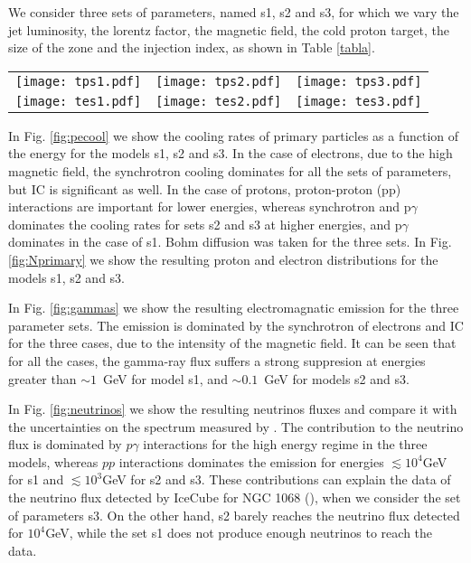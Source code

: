 \documentclass[baaa]{baaa}
\begin{document}
We consider three sets of parameters, named s1, s2 and s3, for which we vary the jet luminosity, the lorentz factor, the magnetic field, the cold proton target, the size of the zone and the injection index, as shown in Table \ref{tabla}. 

\begin{figure*}[!ht] 
\centering
\renewcommand{\arraystretch}{0}
\setlength{\tabcolsep}{0pt}

\begin{tabular}{ccc}
\texttt{[image: tps1.pdf]} &
\texttt{[image: tps2.pdf]} &
\texttt{[image: tps3.pdf]} \\
\texttt{[image: tes1.pdf]} &
\texttt{[image: tes2.pdf]}  &
\texttt{[image: tes3.pdf]} \\
\end{tabular}
%
\caption{\textit{Top panels:} Proton cooling rates for the models s1 (\textit{left panel}), s2 (\textit{middle panel}) and s3 (\textit{right panel}). \textit{Bottom panels}: same as above but for electrons.}
\label{fig:pecool}
\end{figure*}



In Fig. \ref{fig:pecool} we show the cooling rates of primary particles as a function of the energy for the models s1, s2 and s3. In the case of electrons, due to the high magnetic field, the synchrotron cooling dominates for all the sets of parameters, but IC is significant as well. In the case of protons, proton-proton (pp) interactions are important for lower energies, whereas synchrotron and p$\gamma$ dominates the cooling rates for sets s2 and s3 at higher energies, and p$\gamma$ dominates in the case of s1. Bohm diffusion was taken for the three sets. In Fig. \ref{fig:Nprimary} we show the resulting proton and electron distributions for the models s1, s2 and s3.

In Fig. \ref{fig:gammas} we show the resulting electromagnatic emission for the three parameter sets. The emission is dominated by the synchrotron of electrons and IC for the three cases, due to the intensity of the magnetic field. It can be seen that for all the cases, the gamma-ray flux suffers a strong suppresion at energies greater than $\sim 1$~GeV for model s1, and $\sim 0.1$~GeV for models s2 and s3.

In Fig. \ref{fig:neutrinos} we show the resulting neutrinos fluxes and compare it with the uncertainties on the spectrum measured by \cite{Aartsen2020}. The contribution to the neutrino flux is dominated by $p\gamma$ interactions for the high energy regime in the three models, whereas $pp$ interactions dominates the emission for energies $\lesssim10^4$GeV for s1 and $\lesssim10^3$GeV for s2 and s3. These contributions can explain the data of the neutrino flux detected by IceCube for NGC 1068 (\citealt{Aartsen2020}), when we consider the set of parameters s3. On the other hand, s2 barely reaches the neutrino flux detected for $10^4$GeV, while the set s1 does not produce enough neutrinos to reach the data.
\end{document}
